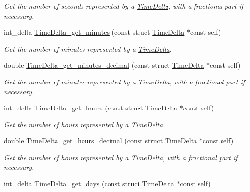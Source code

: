 \begin{DoxyCompactItemize}
\begin{DoxyCompactList}\small\item\em \-Get the number of seconds represented by a \hyperlink{structTimeDelta}{\-Time\-Delta}, with a fractional part if necessary. \end{DoxyCompactList}\item 
int\-\_\-delta \hyperlink{time-delta_8h_acd6e692b20c8d6dbb68f83382eb48fbd}{\-Time\-Delta\-\_\-get\-\_\-minutes} (const struct \hyperlink{structTimeDelta}{\-Time\-Delta} $\ast$const self)
\begin{DoxyCompactList}\small\item\em \-Get the number of minutes represented by a \hyperlink{structTimeDelta}{\-Time\-Delta}. \end{DoxyCompactList}\item 
double \hyperlink{time-delta_8h_a2c6277da4b2e51368680acec96f096df}{\-Time\-Delta\-\_\-get\-\_\-minutes\-\_\-decimal} (const struct \hyperlink{structTimeDelta}{\-Time\-Delta} $\ast$const self)
\begin{DoxyCompactList}\small\item\em \-Get the number of minutes represented by a \hyperlink{structTimeDelta}{\-Time\-Delta}, with a fractional part if necessary. \end{DoxyCompactList}\item 
int\-\_\-delta \hyperlink{time-delta_8h_ab0df8098dd251b0374f3ec9fbb8d2214}{\-Time\-Delta\-\_\-get\-\_\-hours} (const struct \hyperlink{structTimeDelta}{\-Time\-Delta} $\ast$const self)
\begin{DoxyCompactList}\small\item\em \-Get the number of hours represented by a \hyperlink{structTimeDelta}{\-Time\-Delta}. \end{DoxyCompactList}\item 
double \hyperlink{time-delta_8h_ab30868a5efcd2da10005cb24a72963e6}{\-Time\-Delta\-\_\-get\-\_\-hours\-\_\-decimal} (const struct \hyperlink{structTimeDelta}{\-Time\-Delta} $\ast$const self)
\begin{DoxyCompactList}\small\item\em \-Get the number of hours represented by a \hyperlink{structTimeDelta}{\-Time\-Delta}, with a fractional part if necessary. \end{DoxyCompactList}\item 
int\-\_\-delta \hyperlink{time-delta_8h_a8394c0ca6720f02f68004e69be2a140b}{\-Time\-Delta\-\_\-get\-\_\-days} (const struct \hyperlink{structTimeDelta}{\-Time\-Delta} $\ast$const self)

\end{DoxyCompactItemize}

